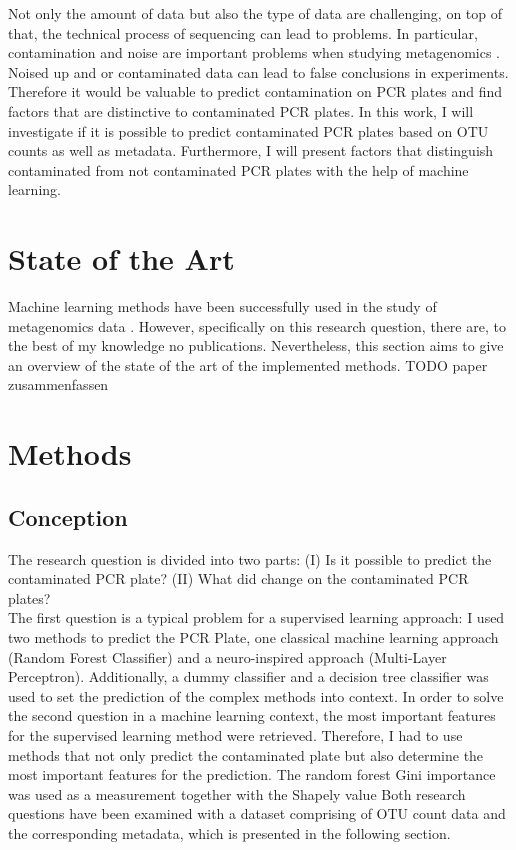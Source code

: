 \documentclass{svproc}
\begin{document}
Not only the amount of data but also the type of data are challenging, on top of that, the technical process of sequencing can lead to problems.
In particular, contamination and noise are important problems when studying metagenomics \cite{paper Michel}. Noised up and or contaminated data can lead to false conclusions in experiments. Therefore it would be valuable to predict contamination on PCR plates and find factors that are distinctive to contaminated PCR plates. In this work, I will investigate if it is possible to predict contaminated PCR plates based on OTU counts as well as metadata. Furthermore, I will present factors that distinguish contaminated from not contaminated PCR plates with the help of machine learning.


\section{State of the Art}
Machine learning methods have been successfully used in the study of metagenomics data  \cite{Soueidan2017}. However, specifically on this research question, there are, to the best of my knowledge no publications. Nevertheless, this section aims to give an overview of the state of the art of the implemented methods. TODO paper zusammenfassen

%
%
\section{Methods}
%
\subsection{Conception}

The research question is divided into two parts: (I) Is it possible to predict the contaminated PCR plate? (II) What did change on the contaminated PCR plates? \\
The first question is a typical problem for a supervised learning approach: I used two methods to predict the PCR Plate, one classical machine learning approach (Random Forest Classifier) and a neuro-inspired approach (Multi-Layer Perceptron).  Additionally, a dummy classifier and a decision tree classifier was used to set the prediction of the complex methods into context.
In order to solve the second question in a machine learning context, the most important features for the supervised learning method were retrieved. Therefore, I had to use methods that not only predict the contaminated plate but also determine the most important features for the prediction. The random forest Gini importance was used as a measurement together with the Shapely value
Both research questions have been examined with a dataset comprising of OTU count data and the corresponding metadata, which is presented in the following section.
\end{document}
